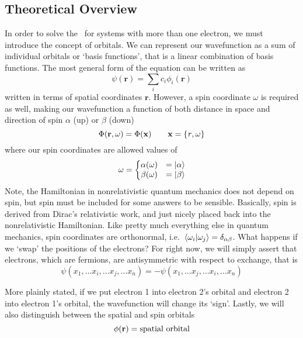 \documentclass[11pt]{article}
\begin{document}
\subsection{Theoretical Overview}
In order to solve the \SE\ for systems with more than one electron, we must introduce the concept of orbitals. We can represent our wavefunction as a sum of individual orbitals or `basis functions', that is a linear combination of basis functions. The most general form of the equation can be written as  
\begin{equation}
\psi(\mathbf{r})= \sum_{i} c_i \phi_i (\mathbf{r})
\end{equation}
written in terms of spatial coordinates $\mathbf{r}$. However, a spin coordinate $\omega$ is required as well, making our wavefunction a function of both distance in space and direction of spin $\alpha$ (up) or $\beta$ (down)
\begin{equation}
\Phi(\mathbf{r},\omega)= \Phi (\mathbf{x}) \qquad \mathbf{x} = \{\mathit{r},\omega\}
\end{equation}
where our spin coordinates are allowed values of 
\begin{equation}
\omega = \bigg\{ \begin{matrix} \alpha (\omega) &= \ket{\alpha}\\
\beta (\omega) & = \ket{\beta}
\end{matrix} 
\end{equation}
Note, the Hamiltonian in nonrelativistic quantum mechanics does not depend on spin, but spin must be included for some answers to be sensible. Basically, spin is derived from Dirac's relativistic work, and just nicely placed back into the nonrelativistic Hamiltonian. Like pretty much everything else in quantum mechanics, spin coordinates are orthonormal, i.e. $\ip*{\omega_i}{\omega_{j}}=\delta_{\alpha \beta}$. What happens if we `swap' the positions of the electrons? For right now, we will simply assert that electrons, which are fermions, are antisymmetric with respect to exchange, that is
\begin{equation} \psi(x_1, \dots x_i, \dots x_j, \dots x_n) = -\psi(x_1, \dots x_j, \dots x_i, \dots x_n)
\end{equation}

More plainly stated, if we put electron 1 into electron 2's orbital and electron 2 into electron 1's orbital, the wavefunction will change its `sign'. Lastly, we will also distinguish between the spatial and spin orbitals 
\begin{equation}
\phi(\textbf{r})= \text{spatial orbital}
\end{equation}
\end{document}
